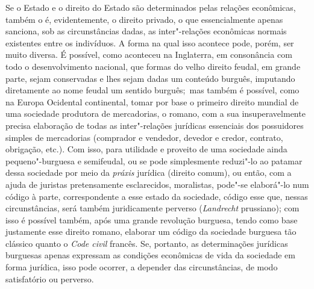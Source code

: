 Se o Estado e o direito do Estado são determinados pelas relações
econômicas, também o é, evidentemente, o direito privado, o que
essencialmente apenas sanciona, sob as circunstâncias dadas, as
inter"-relações econômicas normais existentes entre os indivíduos. A
forma na qual isso acontece pode, porém, ser muito diversa. É possível,
como aconteceu na Inglaterra, em consonância com todo o desenvolvimento
nacional, que formas do velho direito feudal, em grande parte, sejam
conservadas e lhes sejam dadas um conteúdo burguês, imputando
diretamente ao nome feudal um sentido burguês;\est\ mas também é possível,
como na Europa Ocidental continental, tomar por base o primeiro direito
mundial de uma sociedade produtora de mercadorias, o romano, com a sua
insuperavelmente precisa elaboração de todas as inter"-relações jurídicas
essenciais dos possuidores simples de mercadorias (comprador e vendedor,
devedor e credor, contrato, obrigação, etc.). Com isso, para utilidade e
proveito de uma sociedade ainda pequeno"-burguesa e semifeudal, ou se
pode simplesmente reduzi"-lo ao patamar dessa sociedade por meio da
\emph{práxis} jurídica (direito comum), ou então, com a ajuda de
juristas pretensamente esclarecidos, moralistas, pode"-se elaborá"-lo num
código à parte, correspondente a esse estado da sociedade, código esse
que, nessas circunstâncias, será também juridicamente perverso
(\emph{Landrecht} prussiano); com isso é possível também, após uma grande revolução burguesa, tendo como
base justamente esse direito romano, elaborar um código da sociedade
burguesa tão clássico quanto o \emph{Code
civil} francês. Se, portanto, as
determinações jurídicas burguesas apenas expressam as condições
econômicas de vida da sociedade em forma jurídica, isso pode ocorrer, a
depender das circunstâncias, de modo satisfatório ou
perverso.

